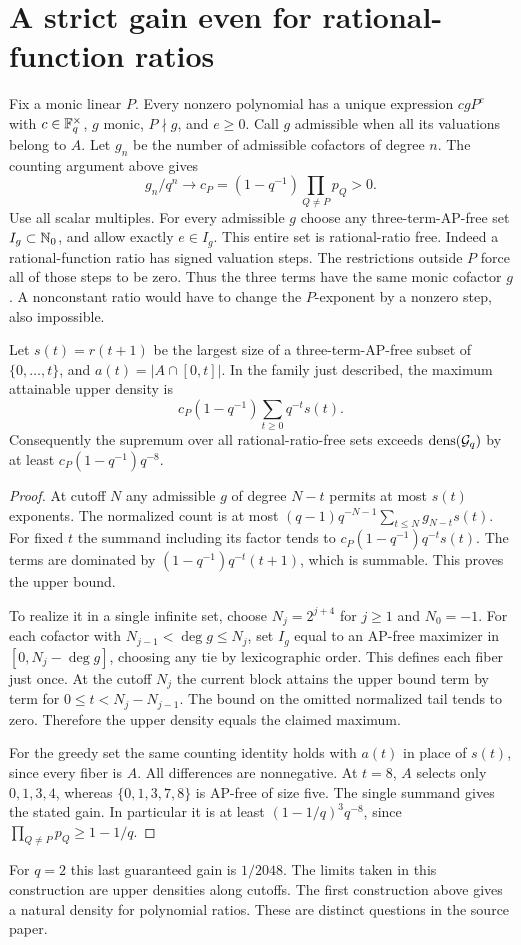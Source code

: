 \documentclass[11pt]{article}
\begin{document}


\section{A strict gain even for rational-function ratios}
Fix a monic linear $P$. Every nonzero polynomial has a unique expression $c gP^e$ with $c\in\mathbb F_q^\times$, $g$ monic, $P\nmid g$, and $e\ge0$. Call $g$ admissible when all its valuations belong to $A$. Let $g_n$ be the number of admissible cofactors of degree $n$. The counting argument above gives
\[
 g_n/q^n\longrightarrow c_P=(1-q^{-1})\prod_{Q\ne P}p_Q>0.
\]
Use all scalar multiples. For every admissible $g$ choose any three-term-AP-free set $I_g\subset\mathbb N_0$, and allow exactly $e\in I_g$. This entire set is rational-ratio free. Indeed a rational-function ratio has signed valuation steps. The restrictions outside $P$ force all of those steps to be zero. Thus the three terms have the same monic cofactor $g$. A nonconstant ratio would have to change the $P$-exponent by a nonzero step, also impossible.

\begin{theorem}
Let $s(t)=r(t+1)$ be the largest size of a three-term-AP-free subset of $\{0,\ldots,t\}$, and $a(t)=|A\cap[0,t]|$. In the family just described, the maximum attainable upper density is
\[
 c_P(1-q^{-1})\sum_{t\ge0}q^{-t}s(t).
\]
Consequently the supremum over all rational-ratio-free sets exceeds $\operatorname{dens}(\mathcal G_q)$ by at least $c_P(1-q^{-1})q^{-8}$.
\end{theorem}
\begin{proof}
At cutoff $N$ any admissible $g$ of degree $N-t$ permits at most $s(t)$ exponents. The normalized count is at most $(q-1)q^{-N-1}\sum_{t\le N}g_{N-t}s(t)$. For fixed $t$ the summand including its factor tends to $c_P(1-q^{-1})q^{-t}s(t)$. The terms are dominated by $(1-q^{-1})q^{-t}(t+1)$, which is summable. This proves the upper bound.

To realize it in a single infinite set, choose $N_j=2^{j+4}$ for $j\ge1$ and $N_0=-1$. For each cofactor with $N_{j-1}<\deg g\le N_j$, set $I_g$ equal to an AP-free maximizer in $[0,N_j-\deg g]$, choosing any tie by lexicographic order. This defines each fiber just once. At the cutoff $N_j$ the current block attains the upper bound term by term for $0\le t<N_j-N_{j-1}$. The bound on the omitted normalized tail tends to zero. Therefore the upper density equals the claimed maximum.

For the greedy set the same counting identity holds with $a(t)$ in place of $s(t)$, since every fiber is $A$. All differences are nonnegative. At $t=8$, $A$ selects only $0,1,3,4$, whereas $\{0,1,3,7,8\}$ is AP-free of size five. The single summand gives the stated gain. In particular it is at least $(1-1/q)^3 q^{-8}$, since $\prod_{Q\ne P}p_Q\ge1-1/q$.
\end{proof}
For $q=2$ this last guaranteed gain is $1/2048$. The limits taken in this construction are upper densities along cutoffs. The first construction above gives a natural density for polynomial ratios. These are distinct questions in the source paper.
\end{document}
